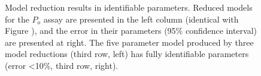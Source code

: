 \documentclass{article}
\newcommand\po{P_o}
\begin{document}
\begin{figure}
\begin{subfigure}[b]{0.48\linewidth}
{\begin{tikzpicture}
\end{tikzpicture}
}

\end{subfigure}
\begin{subfigure}[b]{0.48\linewidth}
\centering
{}
\end{subfigure}

\caption{Model reduction results in identifiable parameters.  Reduced models for the $\po$ assay are presented in the left column (identical with Figure ), and the error in their parameters (95\% confidence interval) are presented at right.  The five parameter model produced by three model reductions (third row, left) has fully identifiable parameters (error <10\%, third row, right).}



\end{figure}


\end{document}
